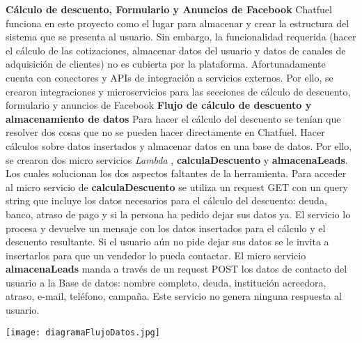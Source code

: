 \textbf{Cálculo de descuento, Formulario y Anuncios de Facebook}
Chatfuel funciona en este proyecto como el lugar para almacenar y crear la estructura del sistema que se presenta al usuario. Sin embargo, la funcionalidad requerida (hacer el cálculo de las cotizaciones, almacenar datos del usuario y datos de canales de adquisición de clientes) no es cubierta por la plataforma. Afortunadamente cuenta con conectores y APIs de integración a servicios externos. Por ello, se crearon integraciones y microservicios para las secciones de cálculo de descuento, formulario y anuncios de Facebook
\textbf{Flujo de cálculo de descuento y almacenamiento de datos}
Para hacer el cálculo del descuento se tenían que resolver dos cosas que no se pueden hacer directamente en Chatfuel. Hacer cálculos sobre datos insertados y almacenar datos en una base de datos. Por ello, se crearon dos micro servicios \textit{Lambda} \cite{kiran2015lambda}, \textbf{calculaDescuento} y \textbf{almacenaLeads}. Los cuales solucionan los dos aspectos faltantes de la herramienta.
Para acceder al micro servicio de \textbf{calculaDescuento} se utiliza un request GET con un query string que incluye los datos necesarios para el cálculo del descuento: deuda, banco, atraso de pago y si la persona ha pedido dejar sus datos ya. 
El servicio lo procesa y devuelve un mensaje con los datos insertados para el cálculo y el descuento resultante. Si el usuario aún no pide dejar sus datos se le invita a insertarlos para que un vendedor lo pueda contactar. 
El micro servicio \textbf{almacenaLeads} manda a través de un request POST los datos de contacto del usuario a la Base de datos: nombre completo, deuda, institución acreedora, atraso, e-mail, teléfono, campaña. Este servicio no genera ninguna respuesta al usuario.

\texttt{[image: diagramaFlujoDatos.jpg]}

